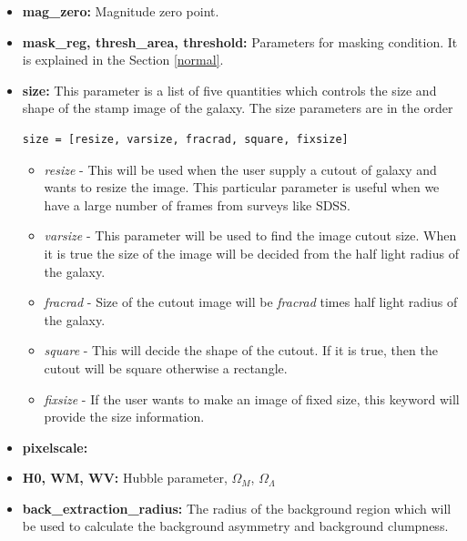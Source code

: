 \documentclass[a4paper,10pt]{article}
\begin{document}
\begin{itemize}
\item \textbf{mag\_zero:} Magnitude zero point.

\item \textbf{mask\_reg, thresh\_area, threshold:} Parameters for masking condition. It is explained in the Section \ref{normal}.

\item \textbf{size:} This parameter is a list of five quantities which controls the size and shape of the stamp image of the galaxy. The size parameters are in the order
\begin{verbatim}
size = [resize, varsize, fracrad, square, fixsize]
\end{verbatim}
\begin{itemize}
\item \textit{resize} - This will be used when the user supply a cutout of galaxy and
 wants to resize the image. This particular parameter is useful when
 we have a large number of frames from surveys like
 SDSS.

\item \textit{varsize} - This parameter will be used to find the image
 cutout size. When it is true the size of the image will be decided from the half light radius of the galaxy.

\item \textit{fracrad} -  Size of the cutout image will be\textit{ fracrad} times half light radius of the
 galaxy.

\item \textit{square} - This will decide the shape of the cutout. If it is true, then the cutout will be square otherwise a rectangle.

\item \textit{ fixsize} - If the user wants to make an image of fixed size,
 this keyword will provide the size information.
\end{itemize}

\item \textbf{pixelscale:}
\item \textbf{H0, WM, WV:} Hubble parameter, $\Omega_M$, $\Omega_\Lambda$

\item \textbf{back\_extraction\_radius:} The radius of the background region which will be used to calculate the background asymmetry and background clumpness.



\end{itemize}
\end{document}
